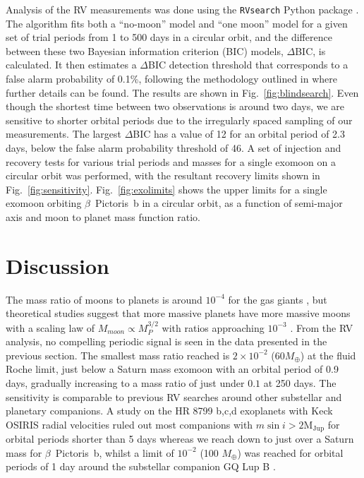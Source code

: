 \documentclass[fleqn,usenatbib]{mnras}
\newcommand{\bpb}{$\beta$~Pictoris~b}
\newcommand{\mj}{$\mathrm{M_{Jup}}$}
\begin{document}
Analysis of the RV measurements was done using the \texttt{RVsearch} Python package \citep{Rosenthal21}.
%
The algorithm fits both a ``no-moon'' model and ``one moon'' model for a given set of trial periods from 1 to 500 days in a circular orbit, and the difference between these two Bayesian information criterion (BIC) models, $\Delta$BIC, is calculated.
%
It then estimates a $\Delta$BIC detection threshold that corresponds to a false alarm probability of 0.1\%, following the methodology outlined in \citet{Howard16} where further details can be found.
%
The results are shown in Fig.~\ref{fig:blindsearch}.
%
Even though the shortest time between two observations is around two days, we are sensitive to shorter orbital periods due to the irregularly spaced sampling of our measurements.
%
The largest $\Delta$BIC has a value of 12 for an orbital period of 2.3 days, below the false alarm probability threshold of 46.
%
A set of injection and recovery tests for various trial periods and masses for a single exomoon on a circular orbit was performed, with the resultant recovery limits shown in Fig.~\ref{fig:sensitivity}.
%
Fig.~\ref{fig:exolimits} shows the upper limits for a single exomoon orbiting \bpb{} in a circular orbit, as a function of semi-major axis and moon to planet mass function ratio.

\section{Discussion}\label{sect:discuss}

The mass ratio of moons to planets is around $10^{-4}$ for the gas giants \citep{Canup06}, but theoretical studies suggest that more massive planets have more massive moons with a scaling law of $M_{moon} \propto M_P^{3/2}$ with ratios approaching $10^{-3}$ \citep[see Eq. 43 in ][]{Batygin20}.
%
From the RV analysis, no compelling periodic signal is seen in the data presented in the previous section.
%
The smallest mass ratio reached is $2\times10^{-2}$ ($60M_\oplus$) at the fluid Roche limit, just below a Saturn mass exomoon with an orbital period of 0.9 days, gradually increasing to a mass ratio of just under $0.1$ at 250 days.
%
The sensitivity is comparable to previous RV searches around other substellar and planetary companions.
%
A study on the HR 8799 b,c,d exoplanets with Keck OSIRIS radial velocities ruled out most companions with $m\sin i > 2$\mj{} for orbital periods shorter than 5 days \citep{Vanderburg21} whereas we reach down to just over a Saturn mass for \bpb{}, whilst a limit of $10^{-2}$ (100 $M_\oplus$) was reached for orbital periods of 1 day around the substellar companion GQ Lup B \citep{Horstman24}.
%
\end{document}
